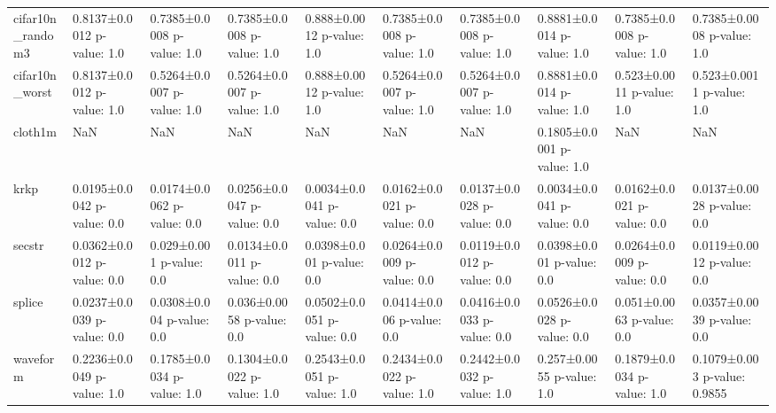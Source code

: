 \begin{tabular}{llllllllll}
cifar10n\_random3 &  0.8137±0.0012 p-value: 1.0 &     0.7385±0.0008 p-value: 1.0 &     0.7385±0.0008 p-value: 1.0 &   0.888±0.0012 p-value: 1.0 &     0.7385±0.0008 p-value: 1.0 &     0.7385±0.0008 p-value: 1.0 &  0.8881±0.0014 p-value: 1.0 &     0.7385±0.0008 p-value: 1.0 &     0.7385±0.0008 p-value: 1.0 \\
cifar10n\_worst   &  0.8137±0.0012 p-value: 1.0 &     0.5264±0.0007 p-value: 1.0 &     0.5264±0.0007 p-value: 1.0 &   0.888±0.0012 p-value: 1.0 &     0.5264±0.0007 p-value: 1.0 &     0.5264±0.0007 p-value: 1.0 &  0.8881±0.0014 p-value: 1.0 &      0.523±0.0011 p-value: 1.0 &      0.523±0.0011 p-value: 1.0 \\
cloth1m          &                         NaN &                            NaN &                            NaN &                         NaN &                            NaN &                            NaN &  0.1805±0.0001 p-value: 1.0 &                            NaN &                            NaN \\
krkp             &  0.0195±0.0042 p-value: 0.0 &     0.0174±0.0062 p-value: 0.0 &     0.0256±0.0047 p-value: 0.0 &  0.0034±0.0041 p-value: 0.0 &     0.0162±0.0021 p-value: 0.0 &     0.0137±0.0028 p-value: 0.0 &  0.0034±0.0041 p-value: 0.0 &     0.0162±0.0021 p-value: 0.0 &     0.0137±0.0028 p-value: 0.0 \\
secstr           &  0.0362±0.0012 p-value: 0.0 &       0.029±0.001 p-value: 0.0 &     0.0134±0.0011 p-value: 0.0 &   0.0398±0.001 p-value: 0.0 &     0.0264±0.0009 p-value: 0.0 &     0.0119±0.0012 p-value: 0.0 &   0.0398±0.001 p-value: 0.0 &     0.0264±0.0009 p-value: 0.0 &     0.0119±0.0012 p-value: 0.0 \\
splice           &  0.0237±0.0039 p-value: 0.0 &      0.0308±0.004 p-value: 0.0 &      0.036±0.0058 p-value: 0.0 &  0.0502±0.0051 p-value: 0.0 &      0.0414±0.006 p-value: 0.0 &     0.0416±0.0033 p-value: 0.0 &  0.0526±0.0028 p-value: 0.0 &      0.051±0.0063 p-value: 0.0 &     0.0357±0.0039 p-value: 0.0 \\
waveform         &  0.2236±0.0049 p-value: 1.0 &     0.1785±0.0034 p-value: 1.0 &     0.1304±0.0022 p-value: 1.0 &  0.2543±0.0051 p-value: 1.0 &     0.2434±0.0022 p-value: 1.0 &     0.2442±0.0032 p-value: 1.0 &   0.257±0.0055 p-value: 1.0 &     0.1879±0.0034 p-value: 1.0 &   0.1079±0.003 p-value: 0.9855 \\
\bottomrule
\end{tabular}
